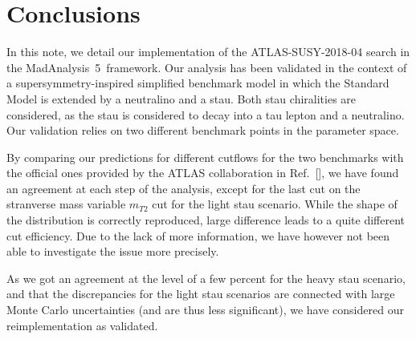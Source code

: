 \documentclass{ws-mpla}
\newcommand{\madanalysis}{{\sc MadAnalysis~5}}
\begin{document}
\section{Conclusions}

In this note, we detail our implementation of the ATLAS-SUSY-2018-04 search in the \madanalysis\ framework. Our analysis has been validated in the context of a supersymmetry-inspired simplified benchmark model in which the Standard Model is extended by a neutralino and a stau. Both stau chiralities are considered, as the stau is considered to decay into a tau lepton and a neutralino. Our validation relies on two different benchmark points in the parameter space.

By comparing our predictions for different cutflows for the two benchmarks with the official ones provided by the ATLAS collaboration in Ref.~[], we have found an agreement at each step of the analysis, except for the last cut on the stranverse mass variable $m_{T2}$ cut for the light stau scenario. While the shape of the distribution is correctly reproduced, large difference leads to a quite different cut efficiency. Due to the lack of more information, we have however not been able to investigate the issue more precisely.

As we got an agreement at the level of a few percent for the heavy stau scenario, and that the discrepancies for the light stau scenarios are connected with large Monte Carlo uncertainties (and are thus less significant), we have considered our reimplementation as validated.

\end{document}
